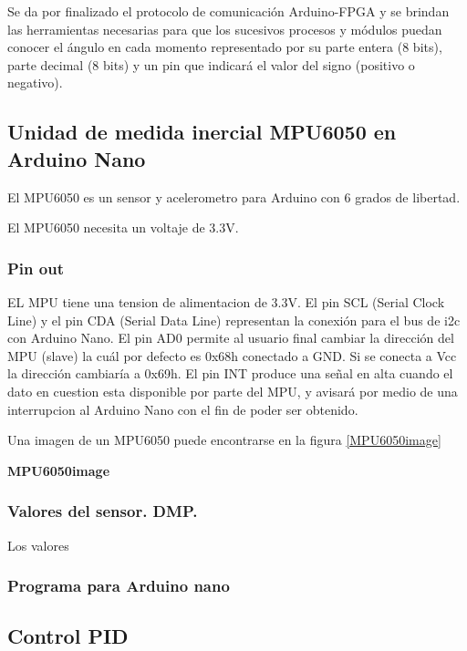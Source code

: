 Se da por finalizado el protocolo de comunicación Arduino-FPGA y se brindan las herramientas necesarias para que los sucesivos procesos y módulos puedan conocer el ángulo en cada momento representado por su parte entera (8 bits), parte decimal (8 bits) y un pin que indicará el valor del signo (positivo o negativo).

\subsection{Unidad de medida inercial MPU6050 en Arduino Nano}\label{sec:MPU6050}

El MPU6050 es un sensor y acelerometro para Arduino con 6 grados de libertad. 

El MPU6050 necesita un voltaje de 3.3V. 

\subsubsection{Pin out}

EL MPU tiene una tension de alimentacion de 3.3V. El pin SCL (Serial Clock Line) y el pin CDA (Serial Data Line) representan la conexión para el bus de i2c con Arduino Nano. El pin AD0 permite al usuario final cambiar la dirección del MPU (slave) la cuál por defecto es 0x68h conectado a GND. Si se conecta a Vcc la dirección cambiaría a 0x69h. El pin INT produce una señal en alta cuando el dato en cuestion esta disponible por parte del MPU, y avisará por medio de una interrupcion al Arduino Nano con el fin de poder ser obtenido. \newline

Una imagen de un MPU6050 puede encontrarse en la figura \ref{MPU6050image}

\textbf{MPU6050image}

\subsubsection{Valores del sensor. DMP. }

Los valores 

\subsubsection{Programa para Arduino nano}



\subsection{Control PID}
